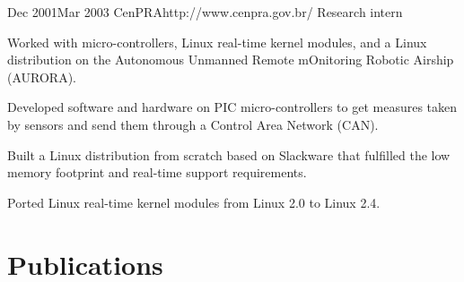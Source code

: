 \documentclass[10pt]{article} %
\begin{document}



\employer
{Dec 2001}{Mar 2003}
{CenPRA}{http://www.cenpra.gov.br/}
\job
{Research intern}
{Worked with micro-controllers, Linux real-time kernel modules, and a Linux distribution on the Autonomous Unmanned Remote mOnitoring Robotic Airship (AURORA).

\begin{itemize-noindent}
\item{Developed software and hardware on PIC micro-controllers to get measures taken by sensors and send them through a Control Area Network (CAN).}
\item{Built a Linux distribution from scratch based on Slackware that fulfilled the low memory footprint and real-time support requirements.}
\item{Ported Linux real-time kernel modules from Linux 2.0 to Linux 2.4.}
\end{itemize-noindent}

}


\section{Publications}
\end{document}
